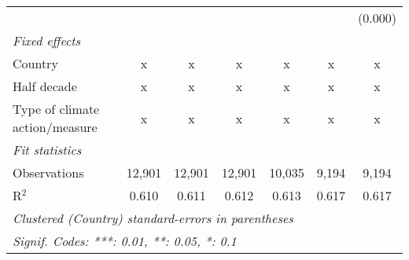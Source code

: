 \begin{tabular}{lcccccc}
                                                       &         &               &                &                &                & (0.000)\\   
   \emph{Fixed effects}\\
   Country                                             & x       & x             & x              & x              & x              & x\\  
   Half decade                                         & x       & x             & x              & x              & x              & x\\  
   Type of climate action/measure                      & x       & x             & x              & x              & x              & x\\  
   \midrule \emph{Fit statistics}\\
   Observations                                        & 12,901  & 12,901        & 12,901         & 10,035         & 9,194          & 9,194\\  
   R$^2$                                               & 0.610   & 0.611         & 0.612          & 0.613          & 0.617          & 0.617\\  
   \midrule
   \multicolumn{7}{l}{\emph{Clustered (Country) standard-errors in parentheses}}\\
   \multicolumn{7}{l}{\emph{Signif. Codes: ***: 0.01, **: 0.05, *: 0.1}}\\
\end{tabular}
\par\endgroup



